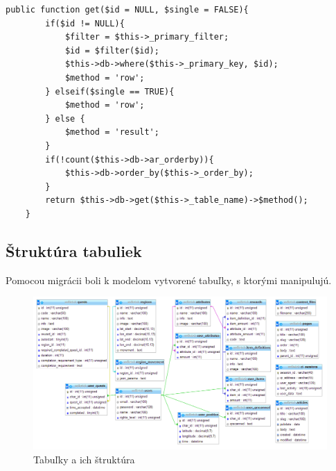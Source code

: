 
\lstset{language=PHP,
basicstyle=\tiny}
\begin{lstlisting}[frame=single]
	public function get($id = NULL, $single = FALSE){
		if($id != NULL){
			$filter = $this->_primary_filter;
			$id = $filter($id);
			$this->db->where($this->_primary_key, $id);
			$method = 'row';
		} elseif($single == TRUE){
			$method = 'row';
		} else {
			$method = 'result';
		}
		if(!count($this->db->ar_orderby)){
			$this->db->order_by($this->_order_by);
		}
		return $this->db->get($this->_table_name)->$method();
	}
\end{lstlisting}

\subsection{Štruktúra tabuliek}
Pomocou migrácii boli k modelom vytvorené tabuľky, s ktorými manipulujú. 

\begin{figure}[h]
  \centering
   \includegraphics[width=14cm]{mainmatter/imgs/db.png}
  \caption{Tabuľky a ich štruktúra}
  \label{fig:db}
\end{figure}
